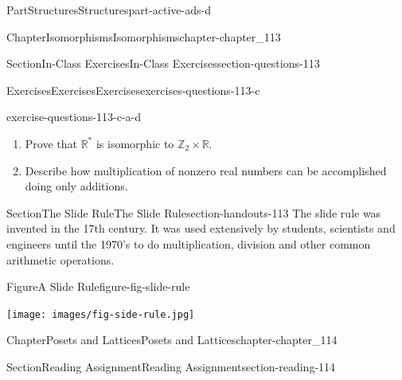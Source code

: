 \documentclass[oneside,10pt,]{book}
\numberwithin{equation}{section}
\begin{document}
\begin{partptx}{Part}{Structures}{}{Structures}{}{}{part-active-ads-d}
\begin{chapterptx}{Chapter}{Isomorphisms}{}{Isomorphisms}{}{}{chapter-chapter_113}
\begin{sectionptx}{Section}{In-Class Exercises}{}{In-Class Exercises}{}{}{section-questions-113}
\begin{exercises-subsection-numberless}{Exercises}{Exercises}{}{Exercises}{}{}{exercises-questions-113-c}
\begin{exercisegroup}
\begin{divisionexerciseeg}{4}{}{}{exercise-questions-113-c-a-d}
\begin{enumerate}[label=(\alph*)]
\item{}Prove that \(\mathbb{R}^*\) is isomorphic to \(\mathbb{Z}_2 \times  \mathbb{R}\).%
\item{}Describe how multiplication of nonzero real numbers can be accomplished doing only additions.%
\end{enumerate}
%
\end{divisionexerciseeg}%
\end{exercisegroup}
\par\medskip\noindent
\end{exercises-subsection-numberless}
\end{sectionptx}
%
%
\typeout{************************************************}
\typeout{************************************************}
%
\begin{sectionptx}{Section}{The Slide Rule}{}{The Slide Rule}{}{}{section-handouts-113}
The slide rule was invented in the 17th century.  It was used extensively  by students, scientists and engineers until the 1970's to do multiplication, division and other common arithmetic operations.%
\begin{figureptx}{Figure}{A Slide Rule}{figure-fig-slide-rule}{}%
\begin{image}{0.25}{0.5}{0.25}{}%
\texttt{[image: images/fig-side-rule.jpg]}
\end{image}%
\tcblower
\end{figureptx}%
\end{sectionptx}
\end{chapterptx}
%
\typeout{************************************************}
\typeout{************************************************}
%
\begin{chapterptx}{Chapter}{Posets and Lattices}{}{Posets and Lattices}{}{}{chapter-chapter_114}
\renewcommand*{\chaptername}{Chapter}
%
%
%
%
\typeout{************************************************}
\typeout{************************************************}
%
\begin{sectionptx}{Section}{Reading Assignment}{}{Reading Assignment}{}{}{section-reading-114}

\end{sectionptx}
\end{chapterptx}
\end{partptx}
\end{document}
